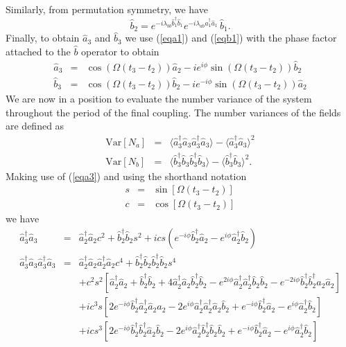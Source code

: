 \documentclass{iopart}
\begin{document}
Similarly, from permutation symmetry, we have
\begin{equation}
\hat{b}_2 = e^{-i \lambda_{bb} \hat{b}_1^{\dagger} \hat{b}_1} e^{-i \lambda_{ab} \hat{a}_1^{\dagger} \hat{a}_1} \, \hat{b}_1.     
\label{eqb2}
\end{equation}
Finally, to obtain $\hat{a}_3$ and $\hat{b}_3$ we use (\ref{eqa1}) and (\ref{eqb1}) with the phase factor attached to the $\hat{b}$ operator to obtain
\begin{eqnarray}
\hat{a}_3 &=& \cos (\Omega (t_3-t_2)) \hat{a}_2 -i e^{i\phi} \sin (\Omega (t_3-t_2)) \hat{b}_2 \label{eqa3} \\
\hat{b}_3 &=& \cos (\Omega (t_3-t_2)) \hat{b}_2 - i e^{-i\phi} \sin (\Omega (t_3-t_2)) \hat{a}_2 \label{eqb3}
\end{eqnarray} 
We are now in a position to evaluate the number variance of the system throughout the period of the final coupling. The number variances of the fields are defined as
\begin{eqnarray}
{\mathrm{Var}}[N_a] &=& \langle \hat{a}^{\dagger}_3 \hat{a}_3 \hat{a}^{\dagger}_3 \hat{a}_3 \rangle - \langle \hat{a}^{\dagger}_3 \hat{a}_3 \rangle ^2 \label{eqNavariance} \\
%
{\mathrm{Var}}[N_b] &=& \langle \hat{b}^{\dagger}_3 \hat{b}_3 \hat{b}^{\dagger}_3 \hat{b}_3 \rangle - \langle \hat{b}^{\dagger}_3 \hat{b}_3 \rangle ^2.
\label{eqNbvariance}
\end{eqnarray}
Making use of (\ref{eqa3}) and using the shorthand notation 
\begin{eqnarray}
s &=& \sin[\Omega (t_3 - t_2)] \\
c &=& \cos[\Omega (t_3 - t_2)]
\end{eqnarray}
we have
\begin{eqnarray}
\hat{a}^{\dagger}_3 \hat{a}_3 &=& \hat{a}^{\dagger}_2 \hat{a}_2 c^2 +  \hat{b}^{\dagger}_2 \hat{b}_2 s^2 + i c s (e^{-i \phi} \hat{b}^{\dagger}_2 \hat{a}_2 - e^{i \phi} \hat{a}^{\dagger}_2 \hat{b}_2) \\
%
%
\hat{a}^{\dagger}_3 \hat{a}_3 \hat{a}^{\dagger}_3 \hat{a}_3 &=& \hat{a}^{\dagger}_2 \hat{a}_2 \hat{a}^{\dagger}_2 \hat{a}_2 c^4 + \hat{b}^{\dagger}_2 \hat{b}_2 \hat{b}^{\dagger}_2 \hat{b}_2 s^4 \nonumber \\
%
&& + c^2 s^2 [ \hat{a}^{\dagger}_2 \hat{a}_2 + \hat{b}^{\dagger}_2 \hat{b}_2 + 4 \hat{a}^{\dagger}_2 \hat{a}_2 \hat{b}^{\dagger}_2 \hat{b}_2 -e^{2 i \phi} \hat{a}^{\dagger}_2 \hat{a}^{\dagger}_2 \hat{b}_2 \hat{b}_2 -e^{-2 i \phi} \hat{b}^{\dagger}_2 \hat{b}^{\dagger}_2 \hat{a}_2 \hat{a}_2 ] \nonumber \\
%
&& + i c^3 s [2 e^{-i \phi} \hat{b}^{\dagger}_2 \hat{a}^{\dagger}_2 \hat{a}_2 \hat{a}_2 - 2 e^{i \phi} \hat{a}^{\dagger}_2 \hat{a}^{\dagger}_2 \hat{a}_2 \hat{b}_2 + e^{-i \phi} \hat{b}^{\dagger}_2 \hat{a}_2 - e^{i \phi} \hat{a}^{\dagger}_2 \hat{b}_2 ] \nonumber \\
%
&& + i c s^3 [2 e^{-i \phi} \hat{b}^{\dagger}_2 \hat{b}^{\dagger}_2 \hat{a}_2 \hat{b}_2 - 2 e^{i \phi} \hat{a}^{\dagger}_2 \hat{b}^{\dagger}_2 \hat{b}_2 \hat{b}_2 + e^{-i \phi} \hat{b}^{\dagger}_2 \hat{a}_2 - e^{i \phi} \hat{a}^{\dagger}_2 \hat{b}_2 ]
\end{eqnarray}
\end{document}
